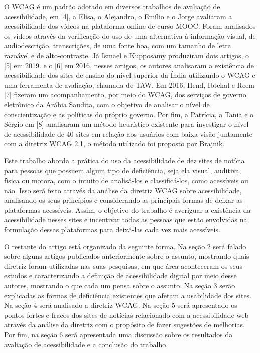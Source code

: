 \documentclass[a4paper]{article}
\begin{document}
\begin{titlepage}
O WCAG é um padrão adotado em diversos trabalhos de avaliação de acessibilidade, em [4], a Elisa, o Alejandro, o Emílio e o Jorge avaliaram a acessibilidade dos vídeos na plataforma online de curso MOOC. Foram analisados os vídeos através da verificação do uso de uma alternativa à informação visual, de audiodescrição, transcrições, de uma fonte boa, com um tamanho de letra razoável e de alto-contraste. Já Ismael e Kupposamy produziram dois artigos, o [5] em 2019. e o [6] em 2016, nesses artigos, os autores analisaram a existência de acessibilidade dos sites de ensino do nível superior da Índia utilizando o WCAG e uma ferramenta de avaliação, chamada de TAW. Em 2016, Hend, Ibtehal e Reem [7] fizeram um acompanhamento, por meio do WCAG, dos serviços de governo eletrônico da Arábia Saudita, com o objetivo de analisar o nível de conscientização e as políticas do próprio governo. Por fim, a Patrícia, a Tania e o Sérgio em [8] analisaram um método heurístico existente para investigar o nível de acessibilidade de 40 sites em relação aos usuários com baixa visão juntamente com a diretriz WCAG 2.1, o método utilizado foi proposto por Brajnik.

Este trabalho aborda a prática do uso da acessibilidade de dez sites de notícia para pessoas que possuem algum tipo de deficiência, seja ela visual, auditiva, física ou motora, com o intuito de analisá-los e classificá-los, como acessíveis ou não. Isso será feito através da análise da diretriz WCAG sobre acessibilidade, analisando os seus princípios e considerando as principais formas de deixar as plataformas acessíveis. Assim, o objetivo do trabalho é averiguar a existência da acessibilidade nesses sites e incentivar todas as pessoas que estão envolvidas na formulação dessas plataformas para deixá-las cada vez mais acessíveis.

O restante do artigo está organizado da seguinte forma. Na seção 2 será falado sobre alguns artigos publicados anteriormente sobre o assunto, mostrando quais diretriz foram utilizadas nas suas pesquisas, em que área aconteceram os seus estudos e caracterizando a definição de acessibilidade digital por meio desse autores, mostrando o que cada um pensa sobre o assunto. Na seção 3 serão explicadas as formas de deficiência existentes que afetam a usabilidade dos sites. Na seção 4 será analisado a diretriz WCAG. Na seção 5 será apresentado os pontos fortes e fracos dos sites de notícias relacionado com a acessibilidade web através da análise da diretriz com o propósito de fazer sugestões de melhorias. Por fim, na seção 6 será apresentada uma discussão sobre os resultados da avaliação de acessibilidade e a conclusão do trabalho.


\end{titlepage}
\end{document}
